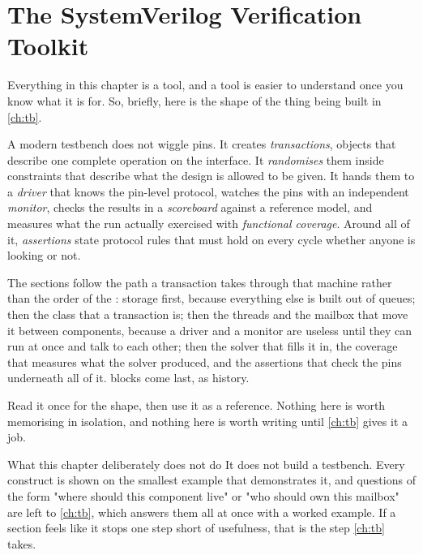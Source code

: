 \chapter{The SystemVerilog Verification Toolkit}
\label{ch:toolkit}


Everything in this chapter is a tool, and a tool is easier to understand once
you know what it is for. So, briefly, here is the shape of the thing being
built in \cref{ch:tb}.

A modern testbench does not wiggle pins. It creates \emph{transactions},
objects that describe one complete operation on the interface. It
\emph{randomises} them inside constraints that describe what the design is
allowed to be given. It hands them to a \emph{driver} that knows the pin-level
protocol, watches the pins with an independent \emph{monitor}, checks the
results in a \emph{scoreboard} against a reference model, and measures what
the run actually exercised with \emph{functional coverage}. Around all of it,
\emph{assertions} state protocol rules that must hold on every cycle whether
anyone is looking or not.

The sections follow the path a transaction takes through that machine rather
than the order of the \LRM{}: storage first, because everything else is built
out of queues; then the class that a transaction is; then the threads and the
mailbox that move it between components, because a driver and a monitor are
useless until they can run at once and talk to each other; then the solver
that fills it in, the coverage that measures what the solver produced, and the
assertions that check the pins underneath all of it.  blocks
come last, as history.

Read it once for the shape, then use it as a reference. Nothing here is worth
memorising in isolation, and nothing here is worth writing until
\cref{ch:tb} gives it a job.

\begin{notebox}{What this chapter deliberately does not do}
It does not build a testbench. Every construct is shown on the smallest
example that demonstrates it, and questions of the form "where should this
component live" or "who should own this mailbox" are left to
\cref{ch:tb}, which answers them all at once with a worked example. If a
section feels like it stops one step short of usefulness, that is the step
\cref{ch:tb} takes.
\end{notebox}



